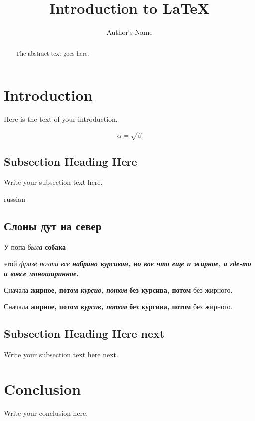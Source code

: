 \documentclass[oneside,final,14pt]{extreport}
\begin{document}
\title{Introduction to \LaTeX{}}
\author{Author's Name}

\maketitle

\begin{abstract}
The abstract text goes here.
\end{abstract}

\section{Introduction}
Here is the text of your introduction.

\begin{equation}
    \label{simple_equation}
    \alpha = \sqrt{ \beta }
\end{equation}

\subsection{Subsection Heading Here}
Write your subsection text here.

\begin{otherlanguage*}{russian}
\subsection{Слоны дут на север}
У попа {\it была} {\bf собака}

 этой \itshape фразе почти все \bfseries 
набрано курсивом, \ttfamily но кое что
\upshape еще и жирное, \rmfamily а где-то
и вовсе \mdseries моноширинное.

Сначала {\bfseries жирное, потом {\itshape курсив, потом}
без курсива, потом} без жирного.

Сначала \textbf{жирное, потом \textit{курсив, потом} без курсива, потом} без жирного.


\end{otherlanguage*}

\subsection{Subsection Heading Here next}
Write your subsection text here next.

\section{Conclusion}
Write your conclusion here.
\end{document}
